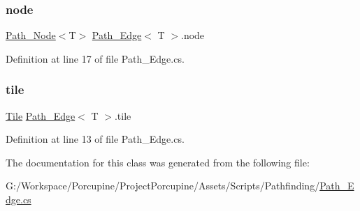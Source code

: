 \subsubsection{\texorpdfstring{node}{node}}
{\footnotesize\ttfamily \hyperlink{class_path___node}{Path\+\_\+\+Node}$<$T$>$ \hyperlink{class_path___edge}{Path\+\_\+\+Edge}$<$ T $>$.node}



Definition at line 17 of file Path\+\_\+\+Edge.\+cs.

\mbox{\label{class_path___edge_ae23989633fd1a0059c1b390a1c829b82}} 
\subsubsection{\texorpdfstring{tile}{tile}}
{\footnotesize\ttfamily \hyperlink{class_tile}{Tile} \hyperlink{class_path___edge}{Path\+\_\+\+Edge}$<$ T $>$.tile}



Definition at line 13 of file Path\+\_\+\+Edge.\+cs.



The documentation for this class was generated from the following file\+:\begin{DoxyCompactItemize}
\item 
G\+:/\+Workspace/\+Porcupine/\+Project\+Porcupine/\+Assets/\+Scripts/\+Pathfinding/\hyperlink{_path___edge_8cs}{Path\+\_\+\+Edge.\+cs}\end{DoxyCompactItemize}

